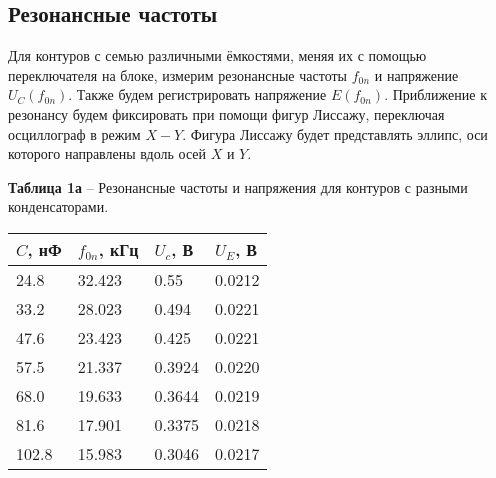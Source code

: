 \documentclass[12pt,a4paper]{article}
\begin{document}
    \subsection{Резонансные частоты}
        Для контуров с семью различными ёмкостями, меняя их с помощью переключателя на блоке, измерим резонансные частоты $f_{0n}$ и напряжение $U_C(f_{0n})$. Также будем регистрировать напряжение $E(f_{0n})$. Приближение к резонансу будем фиксировать при помощи фигур Лиссажу, переключая осциллограф в режим $X-Y$. Фигура Лиссажу будет представлять эллипс, оси которого направлены вдоль осей $X$ и $Y$.
        \begin{table}[!h]
            \begin{center}
           		\textbf{Таблица 1а} -- Резонансные частоты и напряжения для контуров с разными конденсаторами.\\
                \begin{tabular}{ | l | l | l | l | }
                    \hline
                    $C$, нФ &   $f_{0n}$, кГц   &  $U_c$, В & $U_E$, В  \\
                    \hline
                    24.8    &   32.423 &   0.55     &   0.0212  \\
                    33.2    &   28.023 &   0.494    &   0.0221  \\
                    47.6    &   23.423 &   0.425    &   0.0221  \\
                    57.5    &   21.337 &   0.3924   &   0.0220  \\
                    68.0    &   19.633 &   0.3644   &   0.0219  \\
                    81.6    &   17.901 &   0.3375   &   0.0218  \\
                    102.8   &   15.983 &   0.3046   &   0.0217  \\
                    \hline                
                \end{tabular}
            \end{center}
        \end{table}
        
\end{document}
